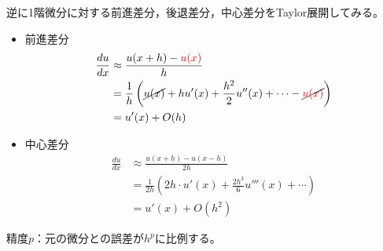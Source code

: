 \documentclass{jsreport}
\begin{document}
	逆に1階微分に対する前進差分，後退差分，中心差分をTaylor展開してみる。
\begin{itemize}
	\item 前進差分
\begin{align*}
	\frac{du}{dx}
	&\approx \frac{u(x+ h)- {\color{red}u(x)}}{h}\\
	&= \frac{1}{h}\left(\cancel{u(x)}+ hu'(x)+ \frac{h^2}{2}u''(x)+ \cdots- \cancel{{\color{red}u(x)}}\right)\\
	&= u'(x)+ O(h)
\end{align*}

	\item 中心差分
\begin{align*}
	\frac{du}{dx}
	&\approx \frac{u(x+ h)- u(x- h)}{2h}\\
	&= \frac{1}{2h}\left(2h\cdot u'(x)+ \frac{2h^3}{6}u'''(x)+ \cdots\right)\\
	&= u'(x)+ O(h^2)
\end{align*}
\end{itemize}
	精度$p$：元の微分との誤差が$h^p$に比例する。
\end{document}
